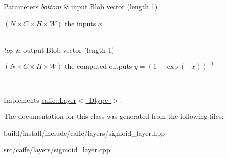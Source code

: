 \begin{DoxyParams}{Parameters}
{\em bottom} & input \mbox{\hyperlink{classcaffe_1_1_blob}{Blob}} vector (length 1)
\begin{DoxyEnumerate}
\item $ (N \times C \times H \times W) $ the inputs $ x $ 
\end{DoxyEnumerate}\\
\hline
{\em top} & output \mbox{\hyperlink{classcaffe_1_1_blob}{Blob}} vector (length 1)
\begin{DoxyEnumerate}
\item $ (N \times C \times H \times W) $ the computed outputs $ y = (1 + \exp(-x))^{-1} $ 
\end{DoxyEnumerate}\\
\hline
\end{DoxyParams}


Implements \mbox{\hyperlink{classcaffe_1_1_layer_a576ac6a60b1e99fe383831f52a6cea77}{caffe\+::\+Layer$<$ Dtype $>$}}.



The documentation for this class was generated from the following files\+:\begin{DoxyCompactItemize}
\item 
build/install/include/caffe/layers/sigmoid\+\_\+layer.\+hpp\item 
src/caffe/layers/sigmoid\+\_\+layer.\+cpp\end{DoxyCompactItemize}
